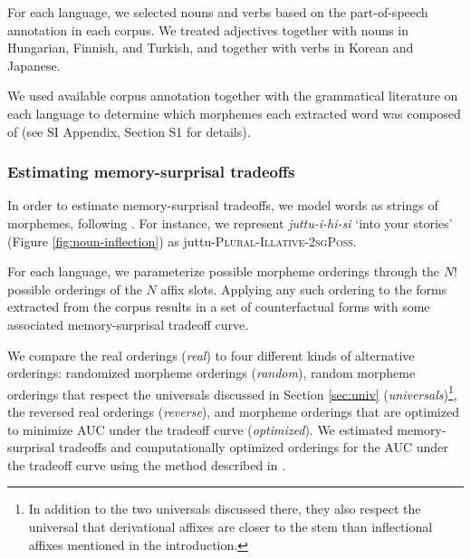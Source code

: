\documentclass[man]{apa7}
\newcommand{\citet}{\Textcite}
\newcommand{\jd}[1]{\textcolor{Pink}{[jd: #1]}}
\begin{document}
For each language, we selected nouns and verbs based on the part-of-speech annotation in each corpus.
We treated adjectives together with nouns in Hungarian, Finnish, and Turkish, and together with verbs in Korean and Japanese.

We used available corpus annotation together with the grammatical literature on each language to determine which morphemes each extracted word was composed of (see SI Appendix, Section S1 for details).



\subsubsection{Estimating memory-surprisal tradeoffs}

In order to estimate memory-surprisal tradeoffs, we model words as strings of morphemes, following \citet{Hahn2020modeling}.
For instance, we represent \textit{juttu-i-hi-si} `into your stories' (Figure \ref{fig:noun-inflection}) as juttu-\textsc{Plural}-\textsc{Illative}-\textsc{2sgPoss}.

For each language, we parameterize possible morpheme orderings through the $N!$ possible orderings of the $N$ affix slots.
Applying any such ordering to the forms extracted from the corpus results in a set of counterfactual forms with some associated memory-surprisal tradeoff curve.


We compare the real orderings (\textit{real}) to four different kinds of alternative orderings: randomized morpheme orderings (\textit{random}), random morpheme orderings that respect the universals discussed in Section \ref{sec:univ} (\textit{universals})\footnote{In addition to the two universals discussed there, they also respect the universal that derivational affixes are closer to the stem than inflectional affixes mentioned in the introduction.}, the reversed real orderings (\textit{reverse}), and morpheme orderings that are optimized to minimize AUC under the tradeoff curve (\textit{optimized}).  We estimated memory-surprisal tradeoffs and computationally optimized orderings for the AUC under the tradeoff curve using the method described in \citet{Hahn2020modeling}.
\end{document}
